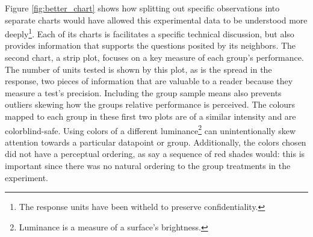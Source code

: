 \documentclass[11pt,a4paper,article]{memoir} %
\begin{document}
   Figure \ref{fig:better_chart} shows how splitting out specific observations into separate charts would have allowed this experimental data to be understood more deeply\footnote{The response units have been witheld to preserve confidentiality.}. Each of its charts is facilitates a specific technical discussion, but also provides information that supports the questions posited by its neighbors. The second chart, a strip plot, focuses on a key measure of each group's performance. The number of units tested is shown by this plot, as is the spread in the response, two pieces of information that are valuable to a reader because they measure a test's precision. Including the group sample means also prevents outliers skewing how the groups relative performance is perceived. The colours mapped to each group in these first two plots are of a similar intensity and are colorblind-safe. Using colors of a different luminance\footnote{Luminance is a measure of a surface's brightness.} can unintentionally skew attention towards a particular datapoint or group. Additionally, the colors chosen did not have a perceptual ordering, as say a sequence of red shades would: this is important since there was no natural ordering to the group treatments in the experiment.
   
\end{document}
